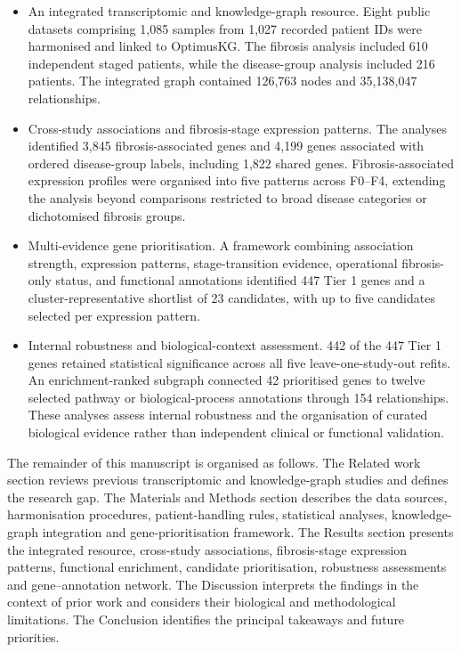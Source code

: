 \documentclass[11pt,a4paper]{article}
\begin{document}
\begin{itemize}
    \item An integrated transcriptomic and knowledge-graph resource. Eight public datasets comprising 1,085 samples from 1,027 recorded patient IDs were harmonised and linked to OptimusKG. The fibrosis analysis included 610 independent staged patients, while the disease-group analysis included 216 patients. The integrated graph contained 126,763 nodes and 35,138,047 relationships.

    \item Cross-study associations and fibrosis-stage expression patterns. The analyses identified 3,845 fibrosis-associated genes and 4,199 genes associated with ordered disease-group labels, including 1,822 shared genes. Fibrosis-associated expression profiles were organised into five patterns across F0--F4, extending the analysis beyond comparisons restricted to broad disease categories or dichotomised fibrosis groups.

    \item Multi-evidence gene prioritisation. A framework combining association strength, expression patterns, stage-transition evidence, operational fibrosis-only status, and functional annotations identified 447 Tier 1 genes and a cluster-representative shortlist of 23 candidates, with up to five candidates selected per expression pattern.

    \item Internal robustness and biological-context assessment. 442 of the 447 Tier 1 genes retained statistical significance across all five leave-one-study-out refits. An enrichment-ranked subgraph connected 42 prioritised genes to twelve selected pathway or biological-process annotations through 154 relationships. These analyses assess internal robustness and the organisation of curated biological evidence rather than independent clinical or functional validation.
\end{itemize}

The remainder of this manuscript is organised as follows. The Related work section reviews previous transcriptomic and knowledge-graph studies and defines the research gap. The Materials and Methods section describes the data sources, harmonisation procedures, patient-handling rules, statistical analyses, knowledge-graph integration and gene-prioritisation framework. The Results section presents the integrated resource, cross-study associations, fibrosis-stage expression patterns, functional enrichment, candidate prioritisation, robustness assessments and gene--annotation network. The Discussion interprets the findings in the context of prior work and considers their biological and methodological limitations. The Conclusion identifies the principal takeaways and future priorities.
\end{document}
